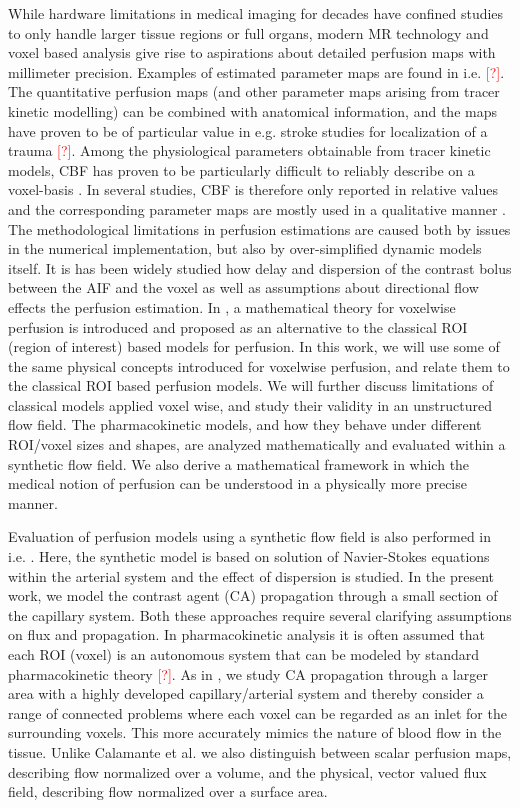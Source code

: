 \documentclass[paper=a4, fontsize=11pt,parskip=half,headings=small]{scrartcl}
\newcommand{\missingsource}{\textcolor{red}{[?]}}
\begin{document}
	While hardware limitations in medical imaging for decades have confined studies to only handle larger tissue regions or full organs, modern MR technology and voxel based analysis give rise to aspirations about detailed perfusion maps with millimeter precision.  
	Examples of estimated parameter maps are found in i.e. \missingsource. The quantitative perfusion maps (and other parameter maps arising from tracer kinetic modelling) can be combined with anatomical information, and the maps have proven to be of particular value in e.g. stroke studies for localization of a trauma \missingsource. 
	Among the physiological parameters obtainable from tracer kinetic models, CBF has proven to be particularly difficult to reliably describe on a voxel-basis \cite{kudo10}.  
	In several studies, CBF is therefore only reported in relative values and the corresponding parameter maps are mostly used in a qualitative manner \cite{calamante99}.
	The methodological limitations in perfusion estimations are caused both by issues in the numerical implementation, but also by over-simplified dynamic models itself.  
	It is has been widely studied how delay and dispersion of the contrast bolus between the AIF and the voxel as well as assumptions about directional flow \cite{thacker03,sourbron14} effects the perfusion estimation. 
	In \cite{sourbron14}, a mathematical theory for voxelwise perfusion is introduced and proposed as an alternative to the classical ROI (region of interest) based models for perfusion. 
	In this work, we will use some of the same physical concepts introduced for voxelwise perfusion, and relate them to the classical ROI based perfusion models.  
	We will further discuss limitations of classical models applied voxel wise, and study their validity in an unstructured flow field.
	The pharmacokinetic models, and how they behave under different ROI/voxel sizes and shapes, are analyzed mathematically and evaluated within a synthetic flow field.  
	We also derive a mathematical framework in which the medical notion of perfusion can be understood in a physically more precise manner.

	Evaluation of perfusion models using a synthetic flow field is also performed in i.e. \cite{calamante03}. 
	Here, the synthetic model is based on solution of Navier-Stokes equations within the arterial system and the effect of dispersion is studied.  
	In the present work, we model the contrast agent (CA) propagation through a small section of the capillary system. 
	Both these approaches require several clarifying assumptions on flux and propagation. 
	In pharmacokinetic analysis it is often assumed that each ROI (voxel) is an autonomous system that can be modeled by standard pharmacokinetic theory \missingsource. 
	As in \cite{calamante03}, we study CA propagation through a larger area with a highly developed capillary/arterial system and thereby consider a range of connected problems where each voxel can be regarded as an inlet for the surrounding voxels.  
This more accurately mimics the nature of blood flow in the tissue.  
	Unlike Calamante et al. \cite{calamante03} we also distinguish between scalar perfusion maps, describing flow normalized over a volume, and the physical, vector valued flux field, describing flow normalized over a surface area. 
\end{document}
